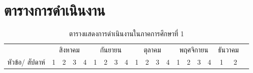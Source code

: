 \documentclass[12pt,oneside,openright,a4paper]{cpe-thai-project}
\begin{document}
\section{ตารางการดําเนินงาน}
\begin{table}[!h]
\caption{ตารางแสดงการดําเนินงานในภาคการศึกษาที่ 1}\label{tbl:table1.1}
\begin{tabular}{llllllllllllllllllll}
\cline{1-19}
\multicolumn{1}{|c|}{}                                                                                       & \multicolumn{4}{c|}{สิงหาคม}                                                                                                                                                                  & \multicolumn{4}{c|}{กันยายน}                                                                                                                                                                  & \multicolumn{4}{c|}{ตุลาคม}                                                                                                                                                                   & \multicolumn{4}{c|}{พฤศจิกายน}                                                                                                                                                                & \multicolumn{2}{c|}{ธันวาคม}                                                                  &  \\ \cline{2-19}
\multicolumn{1}{|c|}{\multirow{-2}{*}{หัวข้อ/ สัปดาห์}}                                                      & \multicolumn{1}{c|}{1}                        & \multicolumn{1}{c|}{2}                        & \multicolumn{1}{c|}{3}                        & \multicolumn{1}{c|}{4}                        & \multicolumn{1}{c|}{1}                        & \multicolumn{1}{c|}{2}                        & \multicolumn{1}{c|}{3}                        & \multicolumn{1}{c|}{4}                        & \multicolumn{1}{c|}{1}                        & \multicolumn{1}{c|}{2}                        & \multicolumn{1}{c|}{3}                        & \multicolumn{1}{c|}{4}                        & \multicolumn{1}{c|}{1}                        & \multicolumn{1}{c|}{2}                        & \multicolumn{1}{c|}{3}                        & \multicolumn{1}{c|}{4}                        & \multicolumn{1}{c|}{1}                        & \multicolumn{1}{c|}{2}                        &  \\ \cline{1-19}

\end{tabular}
\end{table}
\end{document}
